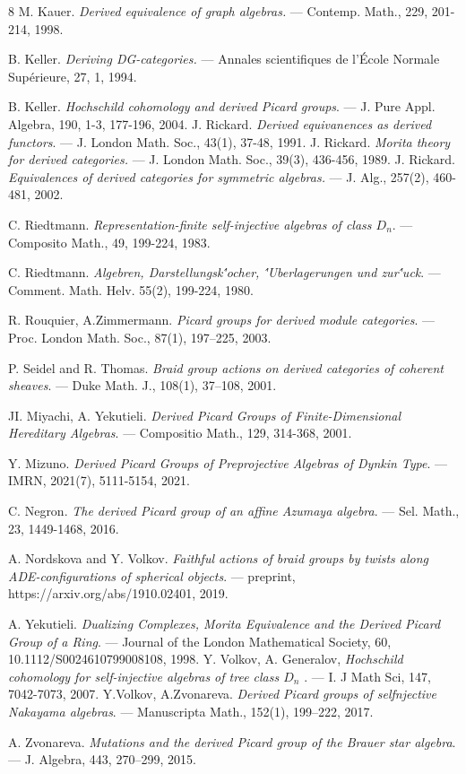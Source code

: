 \documentclass[12pt]{amsart}
\theoremstyle{plain}
\theoremstyle{remark}
\theoremstyle{definition}
\begin{document}
\begin{thebibliography}{8}
 M. Kauer. {\it Derived equivalence of graph algebras.} ---  Contemp. Math., 229, 201-214, 1998. 

 B. Keller. {\it Deriving DG-categories.} --- Annales scientifiques de l'\'Ecole Normale Sup\'erieure, 27, 1, 1994.  


 B. Keller. {\it Hochschild cohomology and derived Picard groups}. --- 
J. Pure Appl. Algebra, 190, 1-3, 177-196, 2004.
  J. Rickard. {\it Derived equivanences as derived functors}. --- J. London Math. Soc., 43(1), 37-48, 1991.
 J. Rickard. {\it Morita theory for derived categories.} --- J. London Math. Soc., 39(3), 436-456, 1989. 
 J. Rickard. {\it Equivalences of derived categories for symmetric algebras.} ---
J. Alg., 257(2), 460-481, 2002. 

 C. Riedtmann. {\it Representation-finite self-injective algebras of class $D_n$}. --- Composito Math., 49, 199-224, 1983.

 C. Riedtmann. {\it Algebren, Darstellungsk\''{o}cher, \''{U}berlagerungen und zur\''{u}ck}. --- Comment. Math. Helv. 55(2), 199-224, 1980. 

R. Rouquier, A.Zimmermann. {\it Picard groups for derived module
categories}. --- Proc. London
Math. Soc., 87(1), 197--225, 2003.

 P. Seidel and R. Thomas. {\it Braid group actions on derived categories of
coherent sheaves}. --- Duke Math. J., 108(1), 37--108, 2001.


 JI. Miyachi, A. Yekutieli. {\it Derived Picard Groups of Finite-Dimensional Hereditary Algebras}. --- Compositio Math., 129, 314-368, 2001. 

 Y. Mizuno. {\it Derived Picard Groups of Preprojective Algebras of Dynkin Type}. --- IMRN, 2021(7), 5111-5154, 2021. 


 C. Negron. {\it The derived Picard group of an affine Azumaya algebra}. --- Sel. Math., 23, 1449-1468, 2016. 

 A. Nordskova and Y. Volkov. {\it Faithful actions of braid groups by twists along ADE-configurations of spherical objects}. --- preprint, https://arxiv.org/abs/1910.02401, 2019.

 A. Yekutieli. {\it Dualizing Complexes, Morita Equivalence and the Derived Picard Group of a Ring}. --- Journal of the London Mathematical Society, 60, 10.1112/S0024610799008108, 1998.
 Y. Volkov, A. Generalov, {\it Hochschild cohomology for self-injective algebras of tree class $D_n$ }. --- I. J Math Sci, 147, 7042-7073, 2007.
Y.Volkov, A.Zvonareva. {\it Derived Picard groups of selfnjective Nakayama
algebras}. --- Manuscripta Math., 152(1), 199--222, 2017. 

 A. Zvonareva. {\it
Mutations and the derived Picard group of the Brauer star algebra}. --- J. Algebra, 443, 270--299, 2015. 

\end{thebibliography}
 
\end{document}
